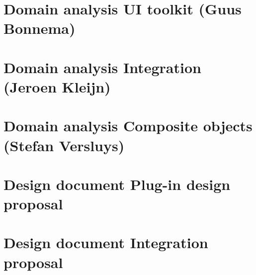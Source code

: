 \chapter{Domain analysis UI toolkit (Guus Bonnema)}


\chapter{Domain analysis Integration (Jeroen Kleijn)}


\chapter{Domain analysis Composite objects (Stefan Versluys)}


\chapter{Design document Plug-in design proposal}


\chapter{Design document Integration proposal}
\label{sec:integration}


\graphicspath{ {../07-reports/} }


